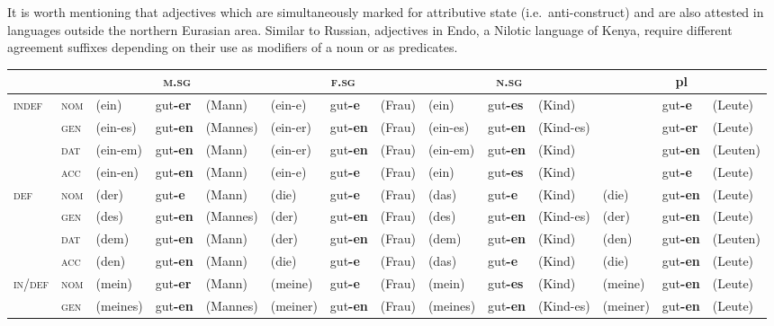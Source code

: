 It is worth mentioning that adjectives which are simultaneously marked for attributive state (i.e.~anti\hyp{}construct) and  are also attested in languages outside the northern Eurasian area. Similar to Russian, adjectives in Endo, a Nilotic language of Kenya, require different agreement suffixes depending on their use as modifiers of a noun or as predicates.
\begin{sidewaystable}
\begin{scriptsize}
\begin{tabular}{ll lll lll lll lll}
\lsptoprule
&&\multicolumn{3}{c}{\textsc{m.sg}}&\multicolumn{3}{c}{\textsc{f.sg}}&\multicolumn{3}{c}{\textsc{n.sg}}&\multicolumn{3}{c}{pl}\\
\midrule
\multirow{4}{*}{\textsc{indef}}&\textsc{nom}&(ein)&gut\textbf{-er}&(Mann)&(ein-e)&gut\textbf{-e}&(Frau)&(ein)&gut\textbf{-es}&(Kind)&&gut\textbf{-e}&(Leute)\\
&\textsc{gen}&(ein-es)&gut\textbf{-en}&(Mannes)&(ein-er)&gut\textbf{-en}&(Frau)&(ein-es)&gut\textbf{-en}&(Kind-es)&&gut\textbf{-er}&(Leute)\\
&\textsc{dat}&(ein-em)&gut\textbf{-en}&(Mann)&(ein-er)&gut\textbf{-en}&(Frau)&(ein-em)&gut\textbf{-en}&(Kind)&&gut\textbf{-en}&(Leuten)\\
&\textsc{acc}&(ein-en)&gut\textbf{-en}&(Mann)&(ein-e)&gut\textbf{-e}&(Frau)&(ein)&gut\textbf{-es}&(Kind)&&gut\textbf{-e}&(Leute)\\
\midrule
\multirow{4}{*}{\textsc{def}}	&\textsc{nom}&(der)&gut\textbf{-e}&(Mann)&(die)&gut\textbf{-e}&(Frau)&(das)&gut\textbf{-e}&(Kind)&(die)&gut\textbf{-en}&(Leute)\\
&\textsc{gen}&(des)&gut\textbf{-en}&(Mannes)&(der)&gut\textbf{-en}&(Frau)&(des)&gut\textbf{-en}&(Kind-es)&(der)&gut\textbf{-en}&(Leute)\\
&\textsc{dat}&(dem)&gut\textbf{-en}&(Mann)&(der)&gut\textbf{-en}&(Frau)&(dem)&gut\textbf{-en}&(Kind)&(den)&gut\textbf{-en}&(Leuten)\\
&\textsc{acc}&(den)&gut\textbf{-en}&(Mann)&(die)&gut\textbf{-e}&(Frau)&(das)&gut\textbf{-e}&(Kind)&(die)&gut\textbf{-en}&(Leute)\\
\midrule
\multirow{4}{*}{\textsc{in/def}}	&\textsc{nom}&(mein)&gut\textbf{-er}&(Mann)&(meine)&gut\textbf{-e}&(Frau)&(mein)&gut\textbf{-es}&(Kind)&(meine)&gut\textbf{-en}&(Leute)\\
&\textsc{gen}&(meines)&gut\textbf{-en}&(Mannes)&(meiner)&gut\textbf{-en}&(Frau)&(meines)&gut\textbf{-en}&(Kind-es)&(meiner)&gut\textbf{-en}&(Leute)\\

\end{tabular}
\end{scriptsize}
\end{sidewaystable}
